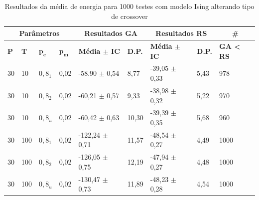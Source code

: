\begin{table}[h!]
	\centering
	\begin{tabular}{|l|l|l|l|l|l|l|l|l|}
		\hline
		\multicolumn{4}{|c|}{\textbf{Parâmetros}}                                                    & \multicolumn{2}{c|}{\textbf{Resultados GA}}                                        & \multicolumn{2}{c|}{\textbf{Resultados RS}}                                        & \multicolumn{1}{c|}{\textbf{\#}}                      \\ \hline
		\textbf{P} & \textbf{T} & $\bm{p_c}$ & $\bm{p_m}$ & \textbf{Média $\pm$ IC} & \textbf{D.P.} & \textbf{Média $\pm$ IC} & \textbf{D.P.} & \textbf{GA < RS} \\ \hline
		30                          & 10                          & $0,8_1$    & 0,02       & -58.90 $\pm$ 0,54                            & 8,77                           & -39,05 $\pm$ 0,33                            & 5,43                           & 978                                          \\ \hline
		30                          & 10                          & $0,8_2$    & 0,02       & -60,21 $\pm$ 0,57                            & 9,33                           & -38,98 $\pm$ 0,32                            & 5,22                           & 970                                          \\ \hline
		30                          & 10                          & $0,8_u$    & 0,02       & -60,42 $\pm$ 0,63                            & 10,30                          & -39,39 $\pm$ 0,35                            & 5,68                           & 960                                          \\ \hline
		30                          & 100                         & $0,8_1$    & 0,02       & -122,24 $\pm$ 0,71                           & 11,57                          & -48,54 $\pm$ 0,27                            & 4,49                           & 1000                                         \\ \hline
		30                          & 100                         & $0,8_2$    & 0,02       & -126,05 $\pm$ 0,75                           & 12,19                          & -47,94 $\pm$ 0,27                            & 4,48                           & 1000                                         \\ \hline
		30                          & 100                         & $0,8_u$    & 0,02       & -130,47 $\pm$ 0,73                           & 11,89                          & -48,23 $\pm$ 0,28                            & 4,54                           & 1000                                         \\ \hline
	\end{tabular}
	\caption{Resultados da média de energia para 1000 testes com modelo Ising alterando tipo de crossover}
	\label{tab:resultados_teste2}
\end{table}

